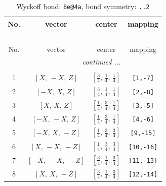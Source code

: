 \documentclass[fleqn,8pt]{jsarticle}
\begin{document}
\begin{longtable}{cccc}
\caption{Wyckoff bond: {\tt 8e@4a}, bond symmetry: {\tt ..2}}
 \\
 \hline \hline
No. & vector & center & mapping \\ \hline \endfirsthead

\multicolumn{3}{l}{\tablename\ \thetable{}} \\
 \hline \hline
No. & vector & center & mapping \\ \hline \endhead

 \hline \hline
\multicolumn{3}{r}{\footnotesize\it continued ...} \\ \endfoot

 \hline \hline
\multicolumn{3}{r}{} \\ \endlastfoot

1 & $\left[ X,\, - X,\, Z \right]$ & $\left[ \frac{3}{4},\, \frac{1}{4},\, \frac{1}{4} \right]$ & {\tt [1,-7]} \\ \hline
2 & $\left[ - X,\, X,\, Z \right]$ & $\left[ \frac{3}{4},\, \frac{1}{4},\, \frac{1}{4} \right]$ & {\tt [2,-8]} \\ \hline
3 & $\left[ X,\, X,\, Z \right]$ & $\left[ \frac{1}{4},\, \frac{3}{4},\, \frac{1}{4} \right]$ & {\tt [3,-5]} \\ \hline
4 & $\left[ - X,\, - X,\, Z \right]$ & $\left[ \frac{1}{4},\, \frac{3}{4},\, \frac{1}{4} \right]$ & {\tt [4,-6]} \\ \hline
5 & $\left[ - X,\, X,\, - Z \right]$ & $\left[ \frac{1}{4},\, \frac{3}{4},\, \frac{3}{4} \right]$ & {\tt [9,-15]} \\ \hline
6 & $\left[ X,\, - X,\, - Z \right]$ & $\left[ \frac{1}{4},\, \frac{3}{4},\, \frac{3}{4} \right]$ & {\tt [10,-16]} \\ \hline
7 & $\left[ - X,\, - X,\, - Z \right]$ & $\left[ \frac{3}{4},\, \frac{1}{4},\, \frac{3}{4} \right]$ & {\tt [11,-13]} \\ \hline
8 & $\left[ X,\, X,\, - Z \right]$ & $\left[ \frac{3}{4},\, \frac{1}{4},\, \frac{3}{4} \right]$ & {\tt [12,-14]} \\
\end{longtable}
\renewcommand{\arraystretch}{1.2}
\end{document}
